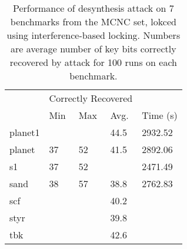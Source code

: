 \begin{table}[ht]
\centering
\caption{Performance of desynthesis attack on 7 benchmarks from the MCNC set, lokced using interference-based locking. Numbers are average number of key bits correctly recovered by attack for 100 runs on each benchmark.}
\label{my-label}
\begin{tabular}{|l|l|l|l|l|}
\hline
                  & \multicolumn{3}{l|}{Correctly Recovered} &          %
                  \\ \cline{2-5} 
                  & Min         & Max         & Avg.         & Time (s) \\ \hline
planet1             &           &            &  44.5        &2932.52\\ \hline
planet             &   37        &   52        &41.5          &2892.06
\\ \hline
s1             &    37       &    52       &           &2471.49
\\ \hline
sand             &   38        &   57        &   38.8       & 2762.83
\\ \hline
scf             &           &           &     40.2    &\\ \hline
styr             &           &           &   39.8       &\\ \hline
tbk             &           &           &    42.6      &\\ \hline

\end{tabular}
\end{table}


